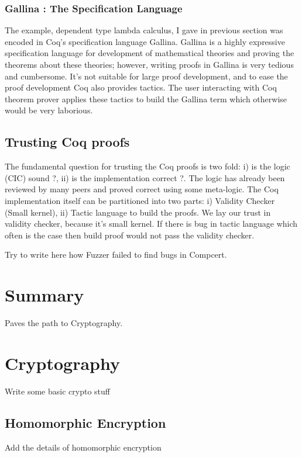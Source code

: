 \subsubsection{Gallina : The Specification Language}
  The example, dependent type lambda calculus, I gave in previous 
  section was encoded in Coq's specification language Gallina. 
  Gallina is a highly expressive specification 
  language for development of mathematical theories and proving the    
  theorems about these  theories; however, writing proofs in Gallina
  is very tedious and cumbersome. It's not suitable for large proof 
  development, and to ease the proof development Coq also provides 
  tactics.  The user interacting with Coq theorem prover applies these 
  tactics to build the  Gallina term  which otherwise would  
  be very laborious.
  
  
 
  

 
 \subsection{Trusting Coq proofs}
  The fundamental question for trusting the Coq proofs is two fold: 
  i) is the logic (CIC) sound ?, ii) is the implementation correct ?. 
  The logic has already been reviewed by many peers and proved correct 
  using some meta-logic. The 
  Coq implementation itself can be partitioned into two parts: 
  i) Validity Checker (Small kernel), 
  ii) Tactic language to build the proofs.
  We lay our trust in validity checker, because it's small kernel. If there
  is bug in tactic language which often is the case then build proof would 
  not pass the validity checker.  
  
  Try to write here how Fuzzer failed to find bugs in Compcert. 
  
\section{Summary} 
  Paves the path to Cryptography. 
    
\section{Cryptography}
    Write some basic crypto stuff
    
    \subsection{Homomorphic Encryption}
     Add the details of 
     homomorphic encryption 
